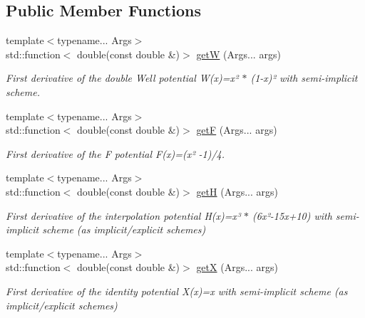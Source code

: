 \subsection*{Public Member Functions}
\begin{DoxyCompactItemize}
\item 
{\footnotesize template$<$typename... Args$>$ }\\std\+::function$<$ double(const double \&)$>$ \hyperlink{structpotential__function_3_011_00_01ThermodynamicsPotentialDiscretization_1_1SemiImplicit_01_4_af7269239087bb065b4133b36fcbd6da6}{getW} (Args... args)
\begin{DoxyCompactList}\small\item\em First derivative of the double Well potential W(x)=x² $\ast$ (1-\/x)² with semi-\/implicit scheme. \end{DoxyCompactList}\item 
{\footnotesize template$<$typename... Args$>$ }\\std\+::function$<$ double(const double \&)$>$ \hyperlink{structpotential__function_3_011_00_01ThermodynamicsPotentialDiscretization_1_1SemiImplicit_01_4_a27140a669c8f1c66c03bb48bda4f33ff}{getF} (Args... args)
\begin{DoxyCompactList}\small\item\em First derivative of the F potential F(x)=(x² -\/1)/4. \end{DoxyCompactList}\item 
{\footnotesize template$<$typename... Args$>$ }\\std\+::function$<$ double(const double \&)$>$ \hyperlink{structpotential__function_3_011_00_01ThermodynamicsPotentialDiscretization_1_1SemiImplicit_01_4_a82e4c4bf76347666f6e4f394581ee2b3}{getH} (Args... args)
\begin{DoxyCompactList}\small\item\em First derivative of the interpolation potential H(x)=x³ $\ast$ (6x²-\/15x+10) with semi-\/implicit scheme (as implicit/explicit schemes) \end{DoxyCompactList}\item 
{\footnotesize template$<$typename... Args$>$ }\\std\+::function$<$ double(const double \&)$>$ \hyperlink{structpotential__function_3_011_00_01ThermodynamicsPotentialDiscretization_1_1SemiImplicit_01_4_ad139574d08b145db4f8ed0274e0d388e}{getX} (Args... args)
\begin{DoxyCompactList}\small\item\em First derivative of the identity potential X(x)=x with semi-\/implicit scheme (as implicit/explicit schemes) \end{DoxyCompactList}\end{DoxyCompactItemize}


